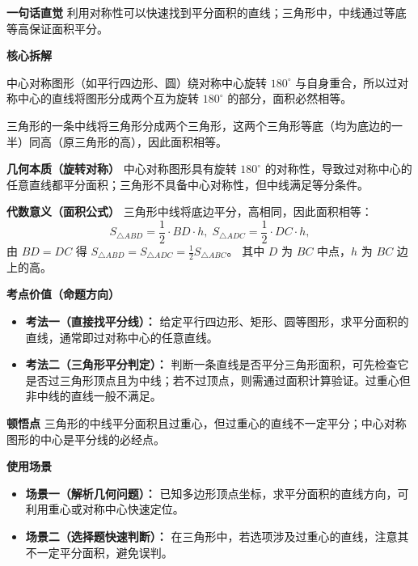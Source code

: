 \begin{explanationbox}
	\textbf{\textcolor{CExplanation}{一句话直觉}}
	利用对称性可以快速找到平分面积的直线；三角形中，中线通过等底等高保证面积平分。

	\medskip
	\textbf{\textcolor{CExplanation}{核心拆解}}
	\begin{description}[style=nextline, leftmargin=2.8em, labelsep=0.5em, itemsep=0.45em]
		\item[\textbf{要点一（对称性）：}]
			中心对称图形（如平行四边形、圆）绕对称中心旋转 $180^\circ$ 与自身重合，所以过对称中心的直线将图形分成两个互为旋转 $180^\circ$ 的部分，面积必然相等。
		\item[\textbf{要点二（等底等高）：}]
			三角形的一条中线将三角形分成两个三角形，这两个三角形等底（均为底边的一半）同高（原三角形的高），因此面积相等。
	\end{description}

	\medskip
	\textbf{\textcolor{CExplanation}{几何本质（旋转对称）}}
	中心对称图形具有旋转 $180^\circ$ 的对称性，导致过对称中心的任意直线都平分面积；三角形不具备中心对称性，但中线满足等分条件。

	\medskip
	\textbf{\textcolor{CExplanation}{代数意义（面积公式）}}
	三角形中线将底边平分，高相同，因此面积相等：
	\[
		S_{\triangle ABD}=\frac12\cdot BD\cdot h,\; S_{\triangle ADC}=\frac12\cdot DC\cdot h,
	\]
	由 $BD=DC$ 得 $S_{\triangle ABD}=S_{\triangle ADC} = \frac12 S_{\triangle ABC}$。 其中 $D$ 为 $BC$ 中点，$h$ 为 $BC$ 边上的高。

	\medskip
	\textbf{\textcolor{CExplanation}{考点价值（命题方向）}}
	\begin{itemize}[leftmargin=*, itemsep=0.5em, topsep=0.4em]
		\item \textbf{考法一（直接找平分线）：} 给定平行四边形、矩形、圆等图形，求平分面积的直线，通常即过对称中心的任意直线。
		\item \textbf{考法二（三角形平分判定）：} 判断一条直线是否平分三角形面积，可先检查它是否过三角形顶点且为中线；若不过顶点，则需通过面积计算验证。过重心但非中线的直线一般不满足。
	\end{itemize}

	\medskip
	\textbf{\textcolor{CExplanation}{顿悟点}}
	三角形的中线平分面积且过重心，但过重心的直线不一定平分；中心对称图形的中心是平分线的必经点。

	\medskip
	\textbf{\textcolor{CExplanation}{使用场景}}
	\begin{itemize}[leftmargin=*, itemsep=0.5em, topsep=0.4em]
		\item \textbf{场景一（解析几何问题）：} 已知多边形顶点坐标，求平分面积的直线方向，可利用重心或对称中心快速定位。
		\item \textbf{场景二（选择题快速判断）：} 在三角形中，若选项涉及过重心的直线，注意其不一定平分面积，避免误判。
	\end{itemize}

\end{explanationbox}
